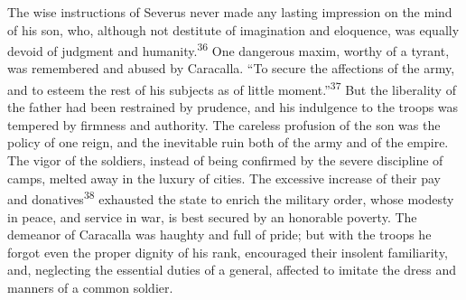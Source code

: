 


The wise instructions of Severus never made any lasting
impression on the mind of his son, who, although not destitute of
imagination and eloquence, was equally devoid of judgment and
humanity.\textsuperscript{36} One dangerous maxim, worthy of a tyrant, was
remembered and abused by Caracalla. “To secure the affections of
the army, and to esteem the rest of his subjects as of little
moment.”\textsuperscript{37} But the liberality of the father had been restrained
by prudence, and his indulgence to the troops was tempered by
firmness and authority. The careless profusion of the son was the
policy of one reign, and the inevitable ruin both of the army and
of the empire. The vigor of the soldiers, instead of being
confirmed by the severe discipline of camps, melted away in the
luxury of cities. The excessive increase of their pay and
donatives\textsuperscript{38} exhausted the state to enrich the military order,
whose modesty in peace, and service in war, is best secured by an
honorable poverty. The demeanor of Caracalla was haughty and full
of pride; but with the troops he forgot even the proper dignity
of his rank, encouraged their insolent familiarity, and,
neglecting the essential duties of a general, affected to imitate
the dress and manners of a common soldier.



